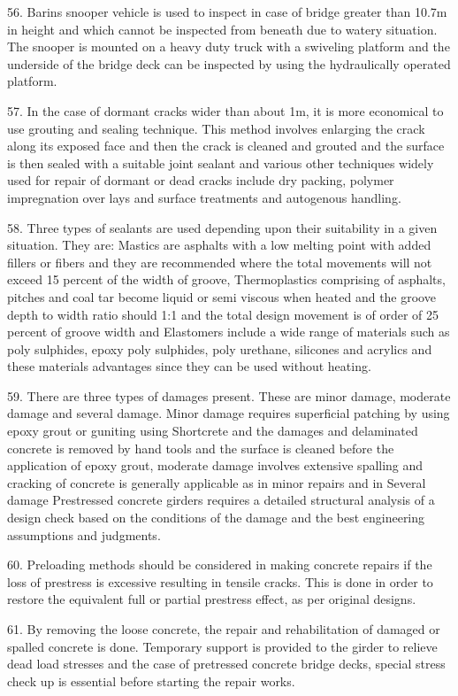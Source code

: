 \documentclass[11pt,a4paper]{article}
\begin{document}
56.
Barins snooper vehicle is used to inspect in case of bridge greater than 10.7m in height and which cannot be inspected from beneath due to watery situation. The snooper is mounted on a heavy duty truck with a swiveling platform and the underside of the bridge deck can be inspected by using the hydraulically operated platform.

57.
In the case of dormant cracks wider than about 1m, it is more economical to use grouting and sealing technique. This method involves enlarging the crack along its exposed face and then the crack is cleaned and grouted and the surface is then sealed with a suitable joint sealant and various other techniques widely used for repair of dormant or dead cracks include dry packing, polymer impregnation over lays and surface treatments and autogenous handling.

58.
Three types of sealants are used depending upon their suitability in a given situation. They are: Mastics are asphalts with a low melting point with added fillers or fibers and they are recommended where the total movements will not exceed 15 percent of the width of groove, Thermoplastics comprising of asphalts, pitches and coal tar become liquid or semi viscous when heated and the groove depth to width ratio should 1:1 and the total design movement is of order of 25 percent of groove width and Elastomers include a wide range of materials such as poly sulphides, epoxy poly sulphides, poly urethane, silicones and acrylics and these materials advantages since they can be used without heating.

59.
There are three types of damages present. These are minor damage, moderate damage and several damage. Minor damage requires superficial patching by using epoxy grout or guniting using Shortcrete and the damages and delaminated concrete is removed by hand tools and the surface is cleaned before the application of epoxy grout, moderate damage involves extensive spalling and cracking of concrete is generally applicable as in minor repairs and in Several damage Prestressed concrete girders requires a detailed structural analysis of a design check based on the conditions of the damage and the best engineering assumptions and judgments.

60.
Preloading methods should be considered in making concrete repairs if the loss of prestress is excessive resulting in tensile cracks. This is done in order to restore the equivalent full or partial prestress effect, as per original designs.

61.
By removing the loose concrete, the repair and rehabilitation of damaged or spalled concrete is done. Temporary support is provided to the girder to relieve dead load stresses and the case of pretressed concrete bridge decks, special stress check up is essential before starting the repair works.
\end{document}
